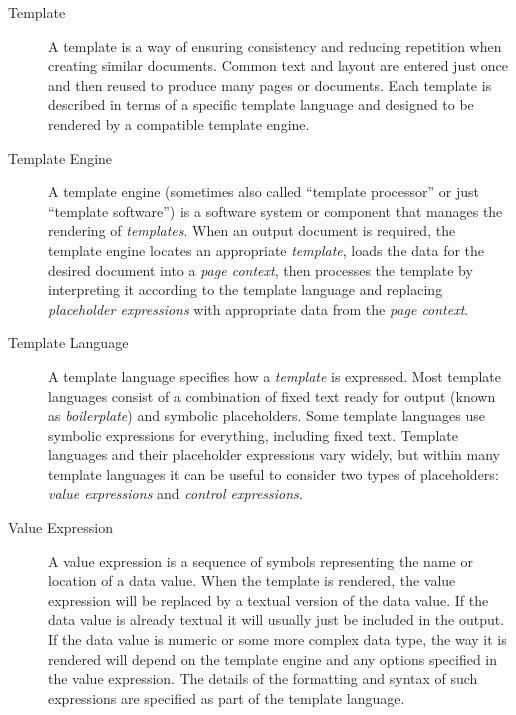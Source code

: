 \begin{description}
\item[Template] 

A template is a way of ensuring consistency and reducing repetition when creating similar documents. Common text and layout are entered just once and then reused to produce many pages or documents. Each template is described in terms of a specific \gls{template language} and designed to be rendered by a compatible \gls{template engine}.

\item[Template Engine] 

A \gls{template engine} (sometimes also called \enquote{template processor} or just \enquote{template software}) is a software system or component that manages the rendering of \emph{templates}. When an output document is required, the \gls{template engine} locates an appropriate \emph{template}, loads the data for the desired document into a \emph{page context}, then processes the template by interpreting it according to the \gls{template language} and replacing \emph{placeholder expressions} with appropriate data from the \emph{page context}. 

\item[Template Language] 

A \gls{template language} specifies how a \emph{template} is expressed. Most \gls{template language}s consist of a combination of fixed text ready for output (known as \emph{boilerplate}) and symbolic placeholders. Some \gls{template language}s use symbolic expressions for everything, including fixed text. Template languages and their placeholder expressions vary widely, but within many \gls{template language}s it can be useful to consider two types of placeholders: \emph{value expressions} and \emph{control expressions}.

\item[Value Expression] 

A value expression is a sequence of symbols representing the name or location of a data value. When the template is rendered, the value expression will be replaced by a textual version of the data value. If the data value is already textual it will usually just be included in the output. If the data value is numeric or some more complex data type, the way it is rendered will depend on the \gls{template engine} and any options specified in the value expression. The details of the formatting and syntax of such expressions are specified as part of the \gls{template language}.


\end{description}
